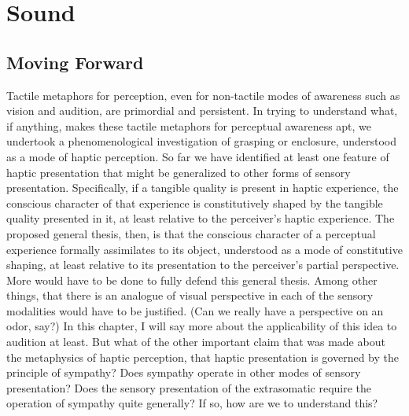 \chapter{Sound} %
\label{cha:sound}

\section{Moving Forward} %
\label{sec:moving_forward}

Tactile metaphors for perception, even for non-tactile modes of awareness such as vision and audition, are primordial and persistent. In trying to understand what, if anything, makes these tactile metaphors for perceptual awareness apt, we undertook a phenomenological investigation of grasping or enclosure, understood as a mode of haptic perception. So far we have identified at least one feature of haptic presentation that might be generalized to other forms of sensory presentation. Specifically, if a tangible quality is present in haptic experience, the conscious character of that experience is constitutively shaped by the tangible quality presented in it, at least relative to the perceiver's haptic experience. The proposed general thesis, then, is that the conscious character of a perceptual experience formally assimilates to its object, understood as a mode of constitutive shaping, at least relative to its presentation to the perceiver's partial perspective. More would have to be done to fully defend this general thesis. Among other things, that there is an analogue of visual perspective in each of the sensory modalities would have to be justified. (Can we really have a perspective on an odor, say?) In this chapter, I will say more about the applicability of this idea to audition at least. But what of the other important claim that was made about the metaphysics of haptic perception, that haptic presentation is governed by the principle of sympathy? Does sympathy operate in other modes of sensory presentation? Does the sensory presentation of the extrasomatic require the operation of sympathy quite generally? If so, how are we to understand this?

